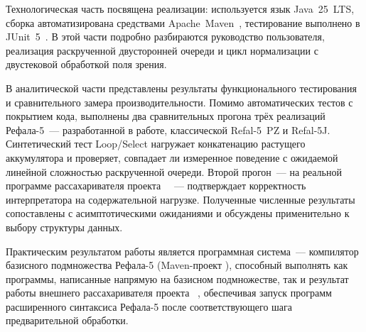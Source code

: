 Технологическая часть посвящена реализации: используется язык Java~25~LTS,
сборка автоматизирована средствами Apache~Maven~\cite{maven_guide}, тестирование
выполнено в JUnit~5~\cite{junit5_guide}. В этой части подробно разбираются
руководство пользователя, реализация раскрученной двусторонней очереди
и цикл нормализации с двустековой обработкой поля зрения.

В аналитической части представлены результаты функционального тестирования и
сравнительного замера производительности. Помимо автоматических тестов с
покрытием кода, выполнены два сравнительных прогона трёх реализаций
Рефала-5~--- разработанной в работе, классической Refal-5~PZ и
Refal-5J. Синтетический тест Loop/Select нагружает конкатенацию растущего
аккумулятора и проверяет, совпадает ли измеренное поведение с ожидаемой
линейной сложностью раскрученной очереди. Второй прогон~--- на реальной
программе рассахаривателя проекта ~\cite{refal5_framework_github}~---
подтверждает корректность интерпретатора на содержательной нагрузке.
Полученные численные результаты сопоставлены с асимптотическими ожиданиями
и обсуждены применительно к выбору структуры данных.

Практическим результатом работы является программная система~--- компилятор
базисного подмножества Рефала-5 (Maven-проект ), способный
выполнять как программы, написанные напрямую на базисном подмножестве, так и
результат работы внешнего рассахаривателя  проекта
~\cite{refal5_framework_github}, обеспечивая запуск
программ расширенного синтаксиса Рефала-5 после соответствующего шага
предварительной обработки.
